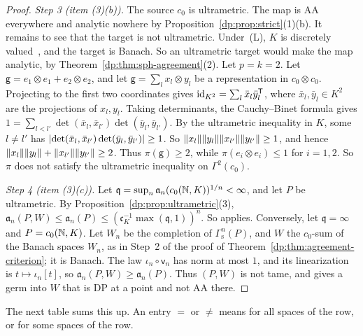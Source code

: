 \begin{proof}
\emph{Step 3 (item (3)(b)).} The source $c_0$ is ultrametric. The map is AA everywhere and analytic nowhere by Proposition~\ref{dp:prop:strict}(1)(b). It remains to see that the target is not ultrametric. Under~(L), $K$ is discretely valued~\cite[Section~7.1]{I}, and the target is Banach. So an ultrametric target would make the map analytic, by Theorem~\ref{dp:thm:sph-agreement}(2). Let $p=k=2$. Let $\mathsf g=e_1\otimes e_1+e_2\otimes e_2$, and let $\mathsf g=\sum_lx_l\otimes y_l$ be a representation in $c_0\otimes c_0$. Projecting to the first two coordinates gives $\mathrm{id}_{K^2}=\sum_l\bar x_l\bar y_l^{\mathsf T}$, where $\bar x_l,\bar y_l\in K^2$ are the projections of $x_l,y_l$. Taking determinants, the Cauchy--Binet formula gives $1=\sum_{l<l'}\det(\bar x_l,\bar x_{l'})\det(\bar y_l,\bar y_{l'})$. By the ultrametric inequality in $K$, some $l\ne l'$ has $\lvert \det(\bar x_l,\bar x_{l'})\det(\bar y_l,\bar y_{l'})\rvert\ge1$. So $\lVert x_l\rVert\lVert y_l\rVert\lVert x_{l'}\rVert\lVert y_{l'}\rVert\ge1$, and hence $\lVert x_l\rVert\lVert y_l\rVert+\lVert x_{l'}\rVert\lVert y_{l'}\rVert\ge2$. Thus $\pi(\mathsf g)\ge2$, while $\pi(e_i\otimes e_i)\le1$ for $i=1,2$. So $\pi$ does not satisfy the ultrametric inequality on $\Gamma^2(c_0)$.

\emph{Step 4 (item (3)(c)).} Let $\mathfrak q=\sup_n\mathfrak a_n(c_0(\mathbb N,K))^{1/n}<\infty$, and let $P$ be ultrametric. By Proposition~\ref{dp:prop:ultrametric}(3), $\mathfrak a_n(P,W)\le\mathfrak a_n(P)\le(\mathfrak c_K^{-1}\max(\mathfrak q,1))^n$. So \cite[Theorem~14.38(1)]{I} applies. Conversely, let $\mathfrak q=\infty$ and $P=c_0(\mathbb N,K)$. Let $W_n$ be the completion of $\Gamma^n_{\mathrm s}(P)$, and $W$ the $c_0$-sum of the Banach spaces $W_n$, as in Step~2 of the proof of Theorem~\ref{dp:thm:agreement-criterion}; it is Banach. The law $\iota_n\circ\mathsf v_n$ has norm at most $1$, and its linearization is $t\mapsto\iota_n[t]$, so $\mathfrak a_n(P,W)\ge\mathfrak a_n(P)$. Thus $(P,W)$ is not tame, and \cite[Proposition~14.37]{I} gives a germ into $W$ that is DP at a point and not AA there.
\end{proof}

The next table sums this up. An entry $=$ or $\ne$ means for all spaces of the row, or for some spaces of the row.

